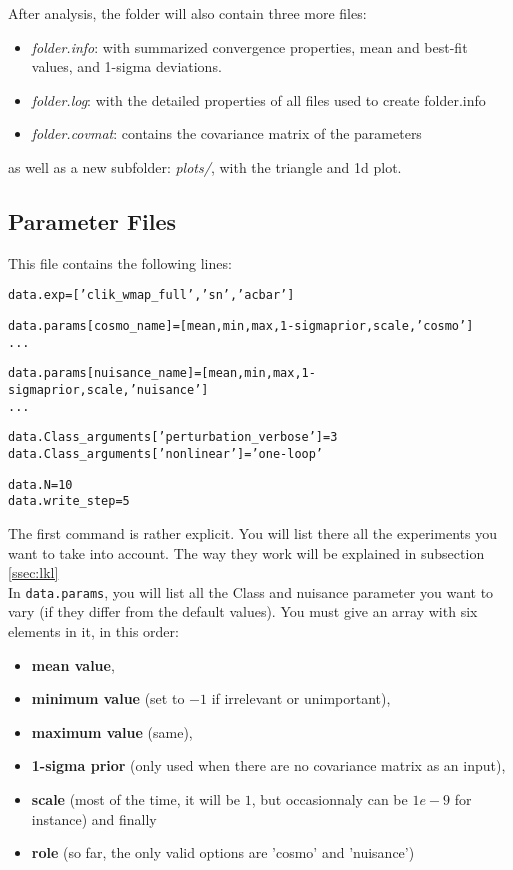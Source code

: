 \documentclass[10pt]{article}
\begin{document}
  After analysis, the folder will also contain three more files:
  \begin{itemize}
    \item \emph{folder.info}: with summarized convergence properties, mean and
      best-fit values, and 1-sigma deviations.
    \item \emph{folder.log}:  with the detailed properties of all files used to create
      folder.info
    \item \emph{folder.covmat}: contains the covariance matrix of the parameters
  \end{itemize}
  as well as a new subfolder: \emph{plots/}, with the triangle and 1d plot.



  \subsection{Parameter Files}
  This file contains the following lines:

  \begin{alltt}
    data.exp = ['clik_wmap_full','sn','acbar']
    
    data.params[cosmo_name]       = [mean,min,max,1-sigma prior,scale,'cosmo']
    ...

    data.params[nuisance_name]    = [mean,min,max,1-sigma prior,scale,'nuisance']
    ...

    data.Class_arguments['perturbation_verbose'] = 3
    data.Class_arguments['non linear']           = 'one-loop'

    data.N = 10
    data.write_step = 5
  \end{alltt}

  The first command is rather explicit. You will list there all the experiments
  you want to take into account. The way they work will be explained in
  subsection \ref{ssec:lkl}\\

  In \verb?data.params?, you will list all the Class and nuisance parameter you
  want to vary (if they differ from the default values). You must give an array
  with six elements in it, in this order: 
  \begin{itemize}
    \item {\bf mean value}, 
    \item {\bf minimum value} (set to $-1$ if irrelevant or unimportant), 
    \item {\bf maximum value} (same), 
    \item {\bf 1-sigma prior} (only used when there are no covariance matrix as
      an input),
    \item {\bf scale} (most of the time, it will be $1$, but occasionnaly can
      be $1e-9$ for instance) and finally 
    \item {\bf role} (so far, the only valid options are 'cosmo' and
      'nuisance')
  \end{itemize}
  
\end{document}
